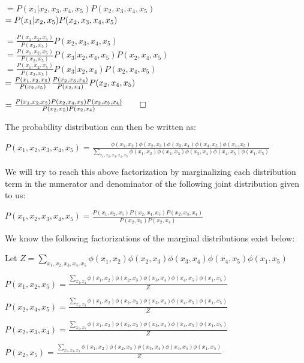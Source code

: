 \documentclass[12pt]{article}
\begin{document}
$= P(x_1 \vert x_2, x_3, x_4, x_5)P(x_2, x_3, x_4, x_5)$\\

$= P(x_1 \vert x_2, x_5)P(x_2, x_3, x_4, x_5)\\$

$= \frac{P(x_1, x_2, x_5)}{P(x_2, x_5)}P(x_2, x_3, x_4, x_5)$\\

$= \frac{P(x_1, x_2, x_5)}{P(x_2, x_5)}P(x_3 \vert x_2, x_4, x_5)P(x_2, x_4, x_5)$\\

$= \frac{P(x_1, x_2, x_5)}{P(x_2, x_5)}P(x_3 \vert x_2, x_4)P(x_2, x_4, x_5)$\\

$= \frac{P(x_1, x_2, x_5)}{P(x_2, x_5)}\frac{P(x_2, x_3, x_4)}{P(x_2, x_4)}P(x_2, x_4, x_5)\\$

$= \frac{P(x_1, x_2, x_5)P(x_2, x_4, x_5)P(x_2, x_3, x_4)}{P(x_2, x_5)P(x_2, x_4)}\qed\\$

The probability distribution can then be written as:

$P(x_1, x_2, x_3, x_4, x_5) = \frac{\phi(x_1, x_2)\phi(x_2, x_3)\phi(x_3, x_4)\phi(x_4, x_5)\phi(x_1, x_5)}{\sum_{x_1, x_2, x_3, x_4, x_5} \phi(x_1, x_2)\phi(x_2, x_3)\phi(x_3, x_4)\phi(x_4, x_5)\phi(x_1, x_5)}$

We will try to reach this above factorization by marginalizing each distribution term in the numerator and denominator of the following joint distribution given to us:

$P(x_1, x_2, x_3, x_4, x_5) = \frac{P(x_1, x_2, x_5)P(x_2, x_4, x_5)P(x_2, x_3, x_4)}{P(x_2, x_5)P(x_2, x_4)}$

We know the following factorizations of the marginal distributions exist below:

Let $Z = \sum_{x_1, x_2, x_3, x_4, x_5} \phi(x_1, x_2)\phi(x_2, x_3)\phi(x_3, x_4)\phi(x_4, x_5)\phi(x_1, x_5)$

$P(x_1, x_2, x_5) = \frac{\sum_{x_3, x_4} \phi(x_1, x_2)\phi(x_2, x_3)\phi(x_3, x_4)\phi(x_4, x_5)\phi(x_1, x_5)}{Z}$

$P(x_2, x_4, x_5) = \frac{\sum_{x_1, x_3} \phi(x_1, x_2)\phi(x_2, x_3)\phi(x_3, x_4)\phi(x_4, x_5)\phi(x_1, x_5)}{Z}$

$P(x_2, x_3, x_4) = \frac{\sum_{x_1, x_5} \phi(x_1, x_2)\phi(x_2, x_3)\phi(x_3, x_4)\phi(x_4, x_5)\phi(x_1, x_5)}{Z}$

$P(x_2, x_5) = \frac{\sum_{x_1, x_3, x_4} \phi(x_1, x_2)\phi(x_2, x_3)\phi(x_3, x_4)\phi(x_4, x_5)\phi(x_1, x_5)}{Z}$
\end{document}
